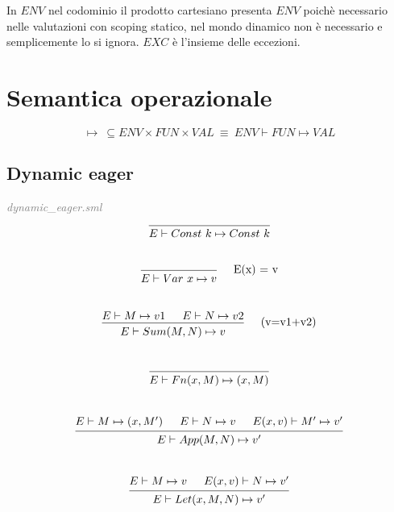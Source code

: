 \documentclass[a4paper]{article}
\begin{document}
	In $ENV$ nel codominio il prodotto cartesiano presenta  $ENV$ poichè necessario nelle valutazioni con scoping statico, nel mondo dinamico non è necessario e semplicemente lo si ignora. $EXC$ è l'insieme delle eccezioni.

	\section{Semantica operazionale}
	\begin{equation} \label{eval}
		\mapsto \ \subseteq ENV \times FUN \times VAL \ \equiv \ ENV \vdash FUN \mapsto VAL
	\end{equation}

	\subsection{Dynamic eager}
	\textit{\textcolor{gray}{dynamic\_eager.sml}} \\

	\[
		\begin{prooftree}
			\hypo{}
			\infer1[]{E \vdash Const \ k \mapsto Const \ k}
		\end{prooftree}
	\]
	\\
	\[
		\begin{prooftree}
			\hypo{}
			\infer1[\quad E(x) = v]{E \vdash Var \ x \mapsto v}
		\end{prooftree}
	\]
	\\
	\[
		\begin{prooftree}
			\hypo{E \vdash M \mapsto v1}
			\hypo{E \vdash N \mapsto v2 }
			\infer2[\quad (v=v1+v2)]{E \vdash Sum(M, N) \mapsto v}
		\end{prooftree}
	\]
	\\
	\[
		\begin{prooftree}
			\hypo{}
			\infer1[]{E \vdash Fn(x, M) \mapsto (x, M)}
		\end{prooftree}
	\]
	\\
	\[
		\begin{prooftree}
			\hypo{E \vdash M \mapsto (x, M')}
			\hypo{E \vdash N \mapsto v}
			\hypo{E(x, v) \vdash M' \mapsto v'}
			\infer3[]{E \vdash App(M, N) \mapsto v'}
		\end{prooftree}
	\]
	\\
	\[
		\begin{prooftree}
			\hypo{E \vdash M \mapsto v}
			\hypo{E(x, v) \vdash N \mapsto v'}
			\infer2[]{E \vdash Let(x, M, N) \mapsto v' }
		\end{prooftree}
	\]
\end{document}
